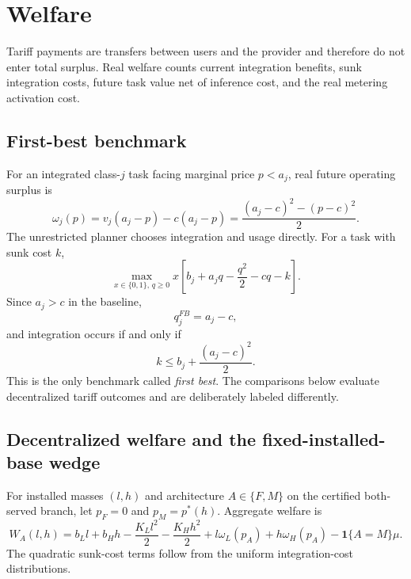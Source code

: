 \section{Welfare}\label{sec:welfare}

Tariff payments are transfers between users and the provider and therefore do not enter total surplus. Real welfare counts current integration benefits, sunk integration costs, future task value net of inference cost, and the real metering activation cost.

\subsection{First-best benchmark}

For an integrated class-$j$ task facing marginal price $p<a_j$, real future operating surplus is
\begin{equation}
 \omega_j(p)
 =v_j(a_j-p)-c(a_j-p)
 =\frac{(a_j-c)^2-(p-c)^2}{2}.
 \label{eq:omega}
\end{equation}
The unrestricted planner chooses integration and usage directly. For a task with sunk cost $k$,
\begin{equation}
 \max_{x\in\{0,1\},\,q\geq0}
 x\left[b_j+a_jq-\frac{q^2}{2}-cq-k\right].
 \label{eq:first-best-program}
\end{equation}
Since $a_j>c$ in the baseline,
\begin{equation}
 q_j^{FB}=a_j-c,
 \label{eq:first-best-q}
\end{equation}
and integration occurs if and only if
\begin{equation}
 k\leq b_j+\frac{(a_j-c)^2}{2}.
 \label{eq:first-best-integrate}
\end{equation}
This is the only benchmark called \emph{first best}. The comparisons below evaluate decentralized tariff outcomes and are deliberately labeled differently.

\subsection{Decentralized welfare and the fixed-installed-base wedge}

For installed masses $(l,h)$ and architecture $A\in\{F,M\}$ on the certified both-served branch, let $p_F=0$ and $p_M=p^*(h)$. Aggregate welfare is
\begin{equation}
 W_A(l,h)
 =b_Ll+b_Hh-\frac{K_Ll^2}{2}-\frac{K_Hh^2}{2}
 +l\omega_L(p_A)+h\omega_H(p_A)
 -\mathbf 1\{A=M\}\mu.
 \label{eq:welfare}
\end{equation}
The quadratic sunk-cost terms follow from the uniform integration-cost distributions.

